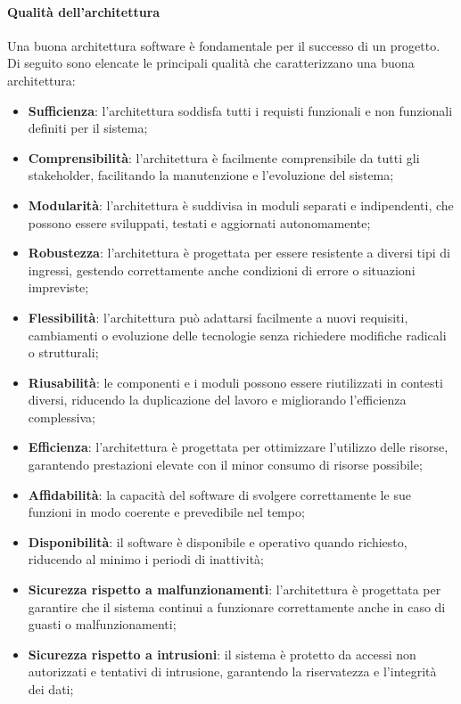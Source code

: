 \documentclass[10pt]{article}
\begin{document}
\begin{justify}
        \paragraph{Qualità dell'architettura}
        Una buona architettura software è fondamentale per il successo di un progetto. Di seguito sono elencate le principali qualità che caratterizzano una buona architettura:
        \begin{itemize}
            \item \textbf{Sufficienza}: l'architettura soddisfa tutti i requisti funzionali e non funzionali definiti per il sistema;
            \item \textbf{Comprensibilità}: l'architettura è facilmente comprensibile da tutti gli stakeholder, facilitando la manutenzione e l'evoluzione del sistema;
            \item \textbf{Modularità}: l'architettura è suddivisa in moduli separati e indipendenti, che possono essere sviluppati, testati e aggiornati autonomamente;
            \item \textbf{Robustezza}: l'architettura è progettata per essere resistente a diversi tipi di ingressi, gestendo correttamente anche condizioni di errore o situazioni impreviste;
            \item \textbf{Flessibilità}: l'architettura può adattarsi facilmente a nuovi requisiti, cambiamenti o evoluzione delle tecnologie senza richiedere modifiche radicali o strutturali;
            \item \textbf{Riusabilità}: le componenti e i moduli possono essere riutilizzati in contesti diversi, riducendo la duplicazione del lavoro e migliorando l'efficienza complessiva;
            \item \textbf{Efficienza}: l'architettura è progettata per ottimizzare l'utilizzo delle risorse, garantendo prestazioni elevate con il minor consumo di risorse possibile;
            \item \textbf{Affidabilità}: la capacità del software di svolgere correttamente le sue funzioni in modo coerente e prevedibile nel tempo;
            \item \textbf{Disponibilità}: il software è disponibile e operativo quando richiesto, riducendo al minimo i periodi di inattività;
            \item \textbf{Sicurezza rispetto a malfunzionamenti}: l'architettura è progettata per garantire che il sistema continui a funzionare correttamente anche in caso di guasti o malfunzionamenti;
            \item \textbf{Sicurezza rispetto a intrusioni}: il sistema è protetto da accessi non autorizzati e tentativi di intrusione, garantendo la riservatezza e l'integrità dei dati;

\end{itemize}
\end{justify}
\end{document}
